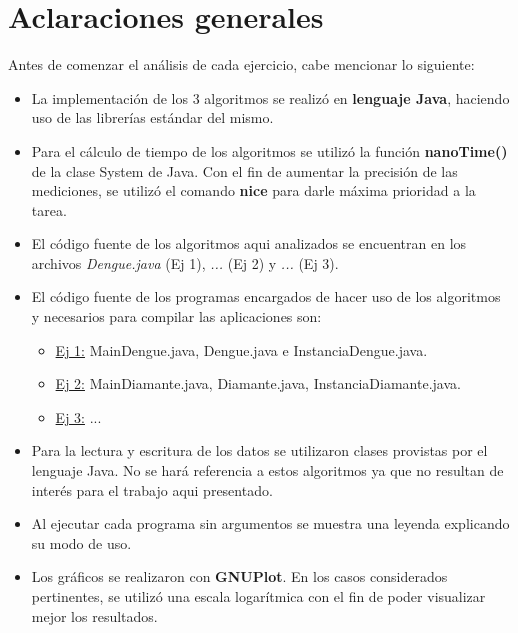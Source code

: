 \documentclass[a4paper,11pt] {article}
\begin{document}
\grupo{}

\maketitle

\bigskip
\section*{Aclaraciones generales}

Antes de comenzar el an\'alisis de cada ejercicio, cabe mencionar lo siguiente:

\begin{itemize}
 \item La implementaci\'on de los 3 algoritmos se realiz\'o en \textbf{lenguaje Java}, haciendo uso de las librer\'ias est\'andar del mismo.
 \item Para el c\'alculo de tiempo de los algoritmos se utiliz\'o la funci\'on \textbf{nanoTime()} de la clase System de Java. Con el fin de aumentar la precisi\'on de las mediciones, se utiliz\'o el comando \textbf{nice} para darle m\'axima prioridad a la tarea.
 \item El c\'odigo fuente de los algoritmos aqui analizados se encuentran en los archivos \textit{Dengue.java} (Ej 1), \textit{...} (Ej 2) y \textit{...} (Ej 3).
 \item El c\'odigo fuente de los programas encargados de hacer uso de los algoritmos y necesarios para compilar las aplicaciones son:
 \begin{itemize}
    \item \underline{Ej 1:} MainDengue.java, Dengue.java e InstanciaDengue.java.
    \item \underline{Ej 2:} MainDiamante.java, Diamante.java, InstanciaDiamante.java.
    \item \underline{Ej 3:} ...
  \end{itemize}
 \item Para la lectura y escritura de los datos se utilizaron clases provistas por el lenguaje Java. No se har\'a referencia a estos algoritmos ya que no resultan de inter\'es para el trabajo aqui presentado.
 \item Al ejecutar cada programa sin argumentos se muestra una leyenda explicando su modo de uso.
 \item Los gr\'aficos se realizaron con \textbf{GNUPlot}. En los casos considerados pertinentes, se utiliz\'o una escala logar\'itmica con el fin de poder visualizar mejor los resultados.
\end{itemize}
\end{document}
